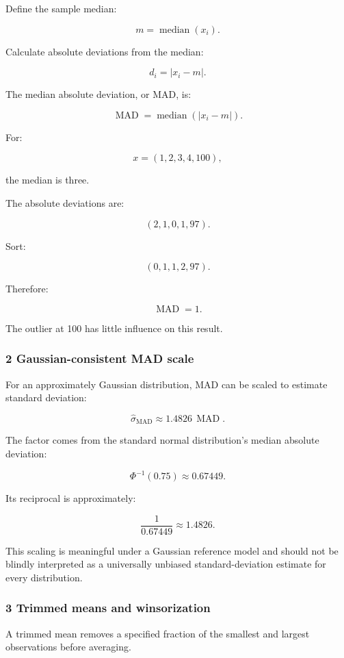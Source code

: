 Define the sample median:

\[
 m=\operatorname{median}(x_i).
\]

Calculate absolute deviations from the median:

\[
 d_i=|x_i-m|.
\]

The median absolute deviation, or MAD, is:

\[
 \boxed{ \operatorname{MAD} = \operatorname{median}(|x_i-m|) }.
\]

For:

\[
 x=(1,2,3,4,100),
\]

the median is three.

The absolute deviations are:

\[
 (2,1,0,1,97).
\]

Sort:

\[
 (0,1,1,2,97).
\]

Therefore:

\[
 \boxed{\operatorname{MAD}=1}.
\]

The outlier at 100 has little influence on this result.

\subsubsection{2 Gaussian-consistent MAD scale}\label{02-foundations-ii-ch030-gaussian-consistent-mad-scale}

For an approximately Gaussian distribution, MAD can be scaled to estimate standard deviation:

\[
 \boxed{ \hat\sigma_{\mathrm{MAD}} \approx1.4826\,\operatorname{MAD} }.
\]

The factor comes from the standard normal distribution's median absolute deviation:

\[
 \Phi^{-1}(0.75)\approx0.67449.
\]

Its reciprocal is approximately:

\[
 \frac1{0.67449}\approx1.4826.
\]

This scaling is meaningful under a Gaussian reference model and should not be blindly interpreted as a universally unbiased standard-deviation estimate for every distribution.

\subsubsection{3 Trimmed means and winsorization}\label{02-foundations-ii-ch030-trimmed-means-and-winsorization}

A trimmed mean removes a specified fraction of the smallest and largest observations before averaging.

